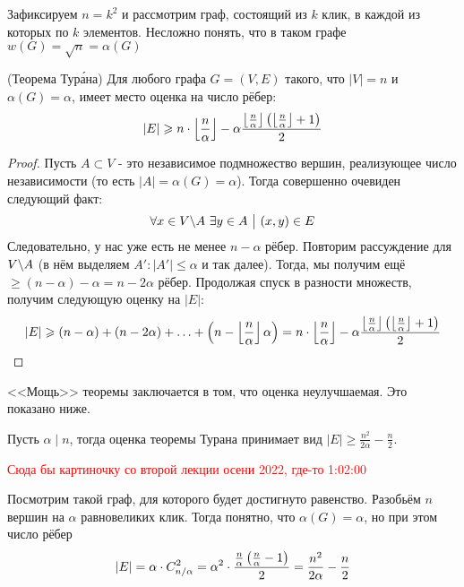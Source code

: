 \begin{example}
	Зафиксируем $n = k^2$ и рассмотрим граф, состоящий из $k$ клик, в каждой из которых по $k$ элементов. Несложно понять, что в таком графе $w(G) = \sqrt{n} = \alpha(G)$
\end{example}

\begin{theorem} (Теорема Тур\'{а}на)
	Для любого графа $G = (V, E)$ такого, что $|V| = n$ и $\alpha(G) = \alpha$, имеет место оценка на число рёбер:
	\[
		|E| \geqslant n \cdot \left\lfloor \frac{n}{\alpha} \right\rfloor - \alpha \frac{\left\lfloor \frac{n}{\alpha} \right\rfloor\left(\left\lfloor \frac{n}{\alpha} \right\rfloor + 1\right)}{2}
	\]
\end{theorem}

\begin{proof}
	Пусть $A \subset V$ - это независимое подмножество вершин, реализующее число независимости (то есть $|A| = \alpha(G) = \alpha$). Тогда совершенно очевиден следующий факт:
	\[
		\forall x \in V \backslash A\ \exists y \in A \ \big|\  (x, y) \in E
	\]
	Следовательно, у нас уже есть не менее $n - \alpha$ рёбер. Повторим рассуждение для $V \backslash A$ (в нём выделяем $A' \colon |A'| \le \alpha$ и так далее). Тогда, мы получим ещё $\ge (n - \alpha) - \alpha = n - 2\alpha$ рёбер. Продолжая спуск в разности множеств, получим следующую оценку на $|E|$:
	\[
		|E| \geqslant (n - \alpha) + (n - 2\alpha) + \ldots + \left(n - \left\lfloor \frac{n}{\alpha} \right\rfloor\alpha\right) = n \cdot \left\lfloor \frac{n}{\alpha} \right\rfloor - \alpha \frac{\left\lfloor \frac{n}{\alpha} \right\rfloor\left(\left\lfloor \frac{n}{\alpha} \right\rfloor + 1\right)}{2}
	\]
\end{proof}

\begin{note}
	<<Мощь>> теоремы заключается в том, что оценка неулучшаемая. Это показано ниже.
\end{note}

\begin{example}
	Пусть $\alpha \mid n$, тогда оценка теоремы Турана принимает вид $|E| \ge \frac{n^2}{2\alpha} - \frac{n}{2}$.
	
	\textcolor{red}{Сюда бы картиночку со второй лекции осени 2022, где-то 1:02:00}
	
	Посмотрим такой граф, для которого будет достигнуто равенство. Разобьём $n$ вершин на $\alpha$ равновеликих клик. Тогда понятно, что $\alpha(G) = \alpha$, но при этом число рёбер
	\[
		|E| = \alpha \cdot C_{n / \alpha}^2 = \alpha^2 \cdot \frac{\frac{n}{\alpha} \left(\frac{n}{\alpha} - 1\right)}{2} = \frac{n^2}{2\alpha} - \frac{n}{2}
	\]
\end{example}

